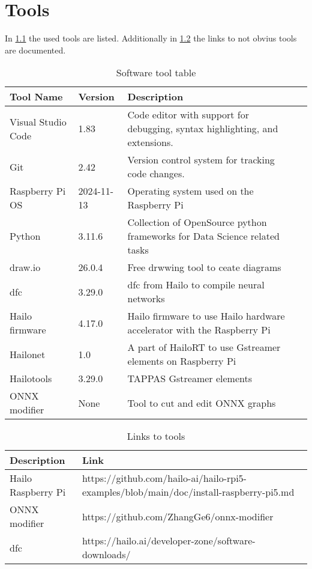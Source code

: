 \chapter{Tools}

In \cref{tab:softwaretools} the used tools are listed.
Additionally in \cref{tab:softwaretoolslinks} the links to not obvius tools are documented.

\begin{table}[h!]
    \centering
    
    \begin{tabularx}{\textwidth}{|l|l|X|X|}
        \hline
        \textbf{Tool Name} & \textbf{Version} & \textbf{Description}   \\ \hline
        Visual Studio Code & 1.83 & Code editor with support for debugging, syntax highlighting, and extensions.  \\ \hline
        Git  & 2.42 & Version control system for tracking code changes.  \\ \hline
        Raspberry Pi OS & 2024-11-13 & Operating system used on the Raspberry Pi  \\ \hline
        Python & 3.11.6 & Collection of OpenSource python frameworks for Data Science
        related tasks  \\ \hline
        draw.io & 26.0.4 & Free drwwing tool to ceate diagrams \\ \hline
        \acrlong{dfc}     & 3.29.0 & \acrlong{dfc} from Hailo to compile neural networks  \\ \hline
        Hailo firmware & 4.17.0 & Hailo firmware to use Hailo hardware accelerator with the Raspberry Pi\\ \hline
        Hailonet & 1.0 & A part of HailoRT to use Gstreamer elements on Raspberry Pi \\ \hline
        Hailotools & 3.29.0 & TAPPAS Gstreamer elements \\ \hline
        ONNX modifier & None & Tool to cut and edit ONNX graphs \\ \hline
    \end{tabularx}
    \caption{Software tool table }
    \label{tab:softwaretools}
\end{table}

\begin{table}[h!]
    \centering
    
    \begin{tabularx}{\textwidth}{|l|X|}
        \hline
        \textbf{Description} & \textbf{Link}\\ \hline
        Hailo Raspberry Pi& https://github.com/hailo-ai/hailo-rpi5-examples/blob/main/doc/install-raspberry-pi5.md \\ \hline
        ONNX modifier & https://github.com/ZhangGe6/onnx-modifier \\ \hline
        \acrlong{dfc} & https://hailo.ai/developer-zone/software-downloads/ \\ \hline
    \end{tabularx}
    \caption{Links to tools}
    \label{tab:softwaretoolslinks}
\end{table}